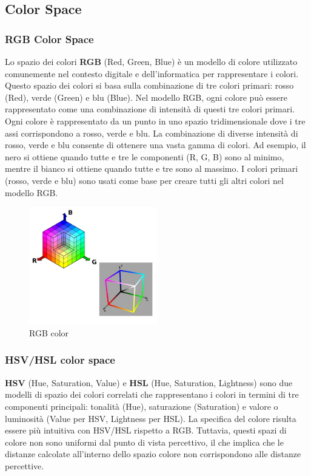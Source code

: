 \subsection{Color Space}
\subsubsection{RGB Color Space}

Lo spazio dei colori \textbf{RGB} (Red, Green, Blue) è un modello di colore utilizzato comunemente nel contesto digitale e dell'informatica per rappresentare i colori. Questo spazio dei colori si basa sulla combinazione di tre colori primari: rosso (Red), verde (Green) e blu (Blue).
Nel modello RGB, ogni colore può essere rappresentato come una combinazione di intensità di questi tre colori primari. Ogni colore è rappresentato da un punto in uno spazio tridimensionale dove i tre assi corrispondono a rosso, verde e blu.
La combinazione di diverse intensità di rosso, verde e blu consente di ottenere una vasta gamma di colori. Ad esempio, il nero si ottiene quando tutte e tre le componenti (R, G, B) sono al minimo, mentre il bianco si ottiene quando tutte e tre
 sono al massimo. I colori primari (rosso, verde e blu) sono usati come base per creare tutti gli altri colori nel modello RGB.
\begin{figure}[H]
    \centering
    \includegraphics[width=0.5\textwidth]{images/RGBCOlor.png} 
    \caption{RGB color}
    \label{fig:immagine}
\end{figure}
\subsubsection{HSV/HSL color space}

\textbf{HSV} (Hue, Saturation, Value) e \textbf{HSL} (Hue, Saturation, Lightness) sono due modelli di spazio dei colori correlati che rappresentano i colori in termini di tre componenti principali: tonalità (Hue), saturazione (Saturation) e valore o luminosità (Value per HSV, Lightness per HSL).
La specifica del colore risulta essere più intuitiva con HSV/HSL rispetto a RGB. Tuttavia, questi spazi di colore non sono uniformi dal punto di vista percettivo, il che implica che le distanze calcolate all'interno dello spazio colore 
non corrispondono alle distanze percettive.
